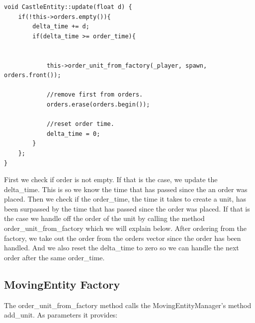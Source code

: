
\begin{lstlisting}
void CastleEntity::update(float d) {
    if(!this->orders.empty()){
        delta_time += d;
        if(delta_time >= order_time){


            this->order_unit_from_factory(_player, spawn, orders.front());

            //remove first from orders.
            orders.erase(orders.begin());
 
            //reset order time.
            delta_time = 0;
        }
    };
}
\end{lstlisting}

First we check if order is not empty. If that is the case, we update the delta\_time. This is so we know the time that has passed since the an order was placed. Then we check if the order\_time, the time it takes to create a unit, has been surpassed by the time that has passed since the order was placed. If that is the case we handle off the order of the unit by calling the method order\_unit\_from\_factory which we will explain below. After ordering from the factory, we take out the order from the orders vector since the order has been handled. And we also reset the delta\_time to zero so we can handle the next order after the same order\_time.

\subsection{MovingEntity Factory}
The order\_unit\_from\_factory method calls the MovingEntityManager's method add\_unit. As parameters it provides:

